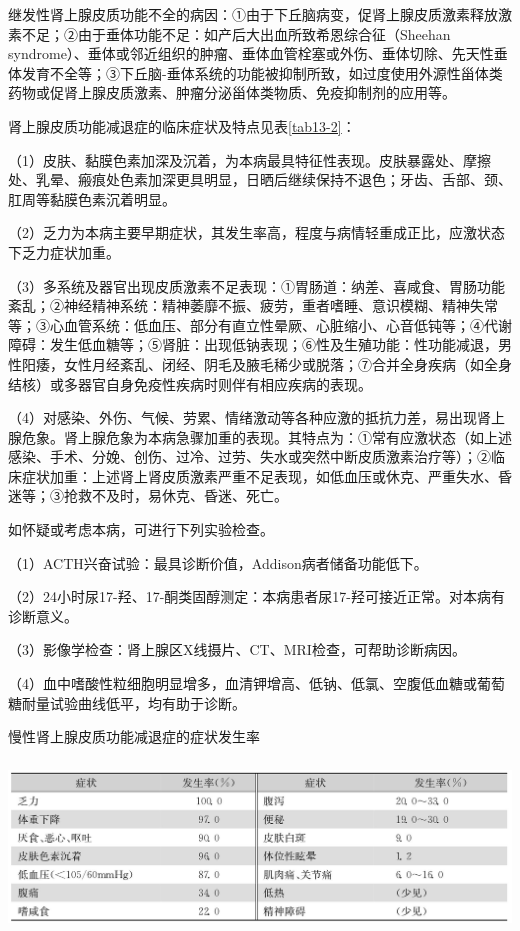 继发性肾上腺皮质功能不全的病因：①由于下丘脑病变，促肾上腺皮质激素释放激素不足；②由于垂体功能不足：如产后大出血所致希恩综合征（Sheehan
syndrome）、垂体或邻近组织的肿瘤、垂体血管栓塞或外伤、垂体切除、先天性垂体发育不全等；③下丘脑-垂体系统的功能被抑制所致，如过度使用外源性甾体类药物或促肾上腺皮质激素、肿瘤分泌甾体类物质、免疫抑制剂的应用等。

肾上腺皮质功能减退症的临床症状及特点见表\ref{tab13-2}：

（1）皮肤、黏膜色素加深及沉着，为本病最具特征性表现。皮肤暴露处、摩擦处、乳晕、瘢痕处色素加深更具明显，日晒后继续保持不退色；牙齿、舌部、颈、肛周等黏膜色素沉着明显。

（2）乏力为本病主要早期症状，其发生率高，程度与病情轻重成正比，应激状态下乏力症状加重。

（3）多系统及器官出现皮质激素不足表现：①胃肠道：纳差、喜咸食、胃肠功能紊乱；②神经精神系统：精神萎靡不振、疲劳，重者嗜睡、意识模糊、精神失常等；③心血管系统：低血压、部分有直立性晕厥、心脏缩小、心音低钝等；④代谢障碍：发生低血糖等；⑤肾脏：出现低钠表现；⑥性及生殖功能：性功能减退，男性阳痿，女性月经紊乱、闭经、阴毛及腋毛稀少或脱落；⑦合并全身疾病（如全身结核）或多器官自身免疫性疾病时则伴有相应疾病的表现。

（4）对感染、外伤、气候、劳累、情绪激动等各种应激的抵抗力差，易出现肾上腺危象。肾上腺危象为本病急骤加重的表现。其特点为：①常有应激状态（如上述感染、手术、分娩、创伤、过冷、过劳、失水或突然中断皮质激素治疗等）；②临床症状加重：上述肾上肾皮质激素严重不足表现，如低血压或休克、严重失水、昏迷等；③抢救不及时，易休克、昏迷、死亡。

如怀疑或考虑本病，可进行下列实验检查。

（1）ACTH兴奋试验：最具诊断价值，Addison病者储备功能低下。

（2）24小时尿17-羟、17-酮类固醇测定：本病患者尿17-羟可接近正常。对本病有诊断意义。

（3）影像学检查：肾上腺区X线摄片、CT、MRI检查，可帮助诊断病因。

（4）血中嗜酸性粒细胞明显增多，血清钾增高、低钠、低氯、空腹低血糖或葡萄糖耐量试验曲线低平，均有助于诊断。

\begin{table}[htbp]
\centering
\caption{慢性肾上腺皮质功能减退症的症状发生率}
\label{tab13-2}
\includegraphics[width=5.91667in,height=1.79167in]{./images/Image00089.jpg}
\end{table}

